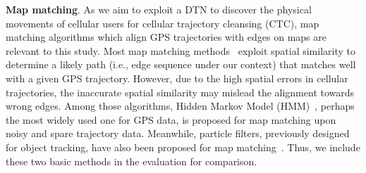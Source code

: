 \documentclass{vldb}
\begin{document}
	
	\noindent\textbf{Map matching}. 
	As we aim to exploit a DTN to discover the physical movements of cellular users for cellular trajectory cleansing (CTC), map matching algorithms which align GPS trajectories with edges on maps are relevant to this study.
	Most map matching methods~\cite{raymond2012map,newson2009hidden,yin2016general,gustafsson2002particle,wei2012fast,kempinska2016probabilistic} exploit spatial similarity to determine a likely path (i.e., edge sequence under our context) that matches well with a given GPS trajectory. 
	However, due to the high spatial errors in cellular trajectories, the inaccurate spatial similarity may mislead the alignment towards wrong edges. Among those algorithms, Hidden Markov Model (HMM)~\cite{newson2009hidden}, perhaps the most widely used one for GPS data, is proposed for map matching upon noisy and spare trajectory data. 
	Meanwhile, particle filters, previously designed for object tracking, have also been proposed for map matching~\cite{kempinska2016probabilistic,gustafsson2002particle}.
	Thus, we include these two basic methods in the evaluation for comparison.
	
\end{document}
